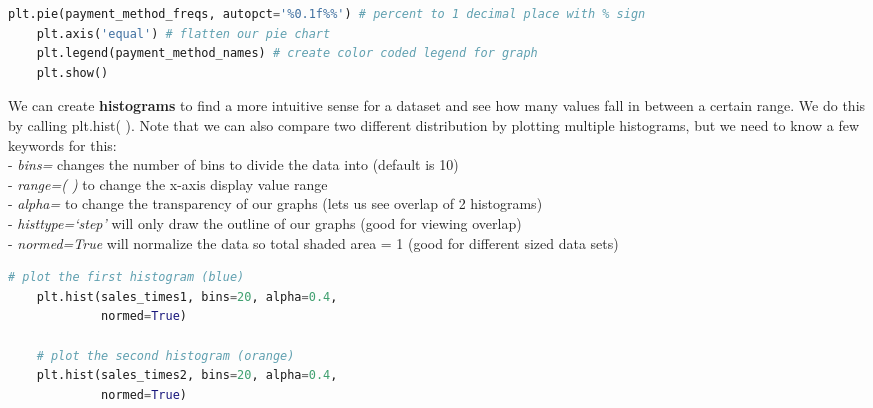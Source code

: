 \documentclass[11pt, a4paper]{article}
\begin{document}
\begin{spacing}{1.1}
\begin{lstlisting}[language=Python]
	plt.pie(payment_method_freqs, autopct='%0.1f%%') # percent to 1 decimal place with % sign
	plt.axis('equal') # flatten our pie chart
	plt.legend(payment_method_names) # create color coded legend for graph
	plt.show() \end{lstlisting}\vspace*{1mm}
	We can create \textbf{histograms} to find a more intuitive sense for a dataset and see how many values fall in between a certain range. We do this by calling plt.hist( ). Note that we can also compare two different distribution by plotting multiple histograms, but we need to know a few keywords for this: \\
	\hspace*{3mm} - \textit{bins=} changes the number of bins to divide the data into (default is 10) \\
	\hspace*{3mm} - \textit{range=( )} to change the x-axis display value range \\
	\hspace*{3mm} - \textit{alpha=} to change the transparency of our graphs (lets us see overlap of 2 histograms) \\
	\hspace*{3mm} - \textit{histtype=`step'} will only draw the outline of our graphs (good for viewing overlap) \\
	\hspace*{3mm} - \textit{normed=True} will normalize the data so total shaded area = 1 (good for different sized data sets)
	\begin{minipage}[c]{9cm}
	\begin{lstlisting}[language=Python]
	# plot the first histogram (blue)
	plt.hist(sales_times1, bins=20, alpha=0.4, 
	         normed=True)
	         
	# plot the second histogram (orange)
	plt.hist(sales_times2, bins=20, alpha=0.4, 
	         normed=True)
	         

\end{lstlisting}
\end{minipage}
\end{spacing}
\end{document}
